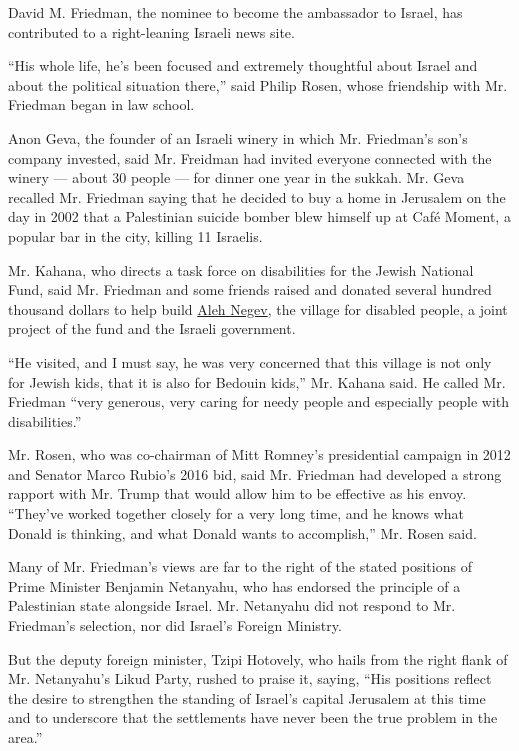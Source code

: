 David M. Friedman, the nominee to become the ambassador to Israel, has
contributed to a right-leaning Israeli news site.

``His whole life, he's been focused and extremely thoughtful about
Israel and about the political situation there,'' said Philip Rosen,
whose friendship with Mr. Friedman began in law school.

Anon Geva, the founder of an Israeli winery in which Mr. Friedman's
son's company invested, said Mr. Freidman had invited everyone connected
with the winery --- about 30 people --- for dinner one year in the
sukkah. Mr. Geva recalled Mr. Friedman saying that he decided to buy a
home in Jerusalem on the day in 2002 that a Palestinian suicide bomber
blew himself up at Café Moment, a popular bar in the city, killing 11
Israelis.

Mr. Kahana, who directs a task force on disabilities for the Jewish
National Fund, said Mr. Friedman and some friends raised and donated
several hundred thousand dollars to help build
\href{https://aleh.org/aleh-branches/aleh-negev-nahalat-eran/?v=7516fd43adaa}{Aleh
Negev}, the village for disabled people, a joint project of the fund and
the Israeli government.

``He visited, and I must say, he was very concerned that this village is
not only for Jewish kids, that it is also for Bedouin kids,'' Mr. Kahana
said. He called Mr. Friedman ``very generous, very caring for needy
people and especially people with disabilities.''

Mr. Rosen, who was co-chairman of Mitt Romney's presidential campaign in
2012 and Senator Marco Rubio's 2016 bid, said Mr. Friedman had developed
a strong rapport with Mr. Trump that would allow him to be effective as
his envoy. ``They've worked together closely for a very long time, and
he knows what Donald is thinking, and what Donald wants to accomplish,''
Mr. Rosen said.

Many of Mr. Friedman's views are far to the right of the stated
positions of Prime Minister Benjamin Netanyahu, who has endorsed the
principle of a Palestinian state alongside Israel. Mr. Netanyahu did not
respond to Mr. Friedman's selection, nor did Israel's Foreign Ministry.

But the deputy foreign minister, Tzipi Hotovely, who hails from the
right flank of Mr. Netanyahu's Likud Party, rushed to praise it, saying,
``His positions reflect the desire to strengthen the standing of
Israel's capital Jerusalem at this time and to underscore that the
settlements have never been the true problem in the area.''

